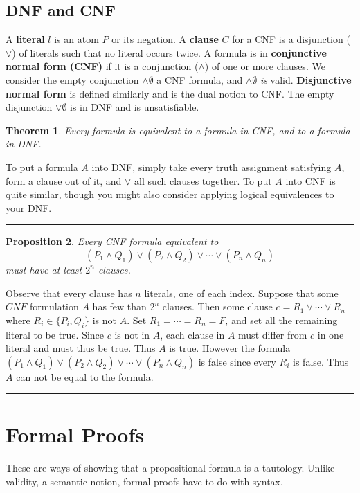 \documentclass[twoside]{article}
\newcounter{lecnum}
\newtheorem{theorem}{Theorem}[lecnum]
\newtheorem{proposition}[theorem]{Proposition}
\newenvironment{proof}{{\bf Proof:}}{\hfill\rule{2mm}{2mm}}
\begin{document}
\subsection{DNF and CNF}
A \textbf{literal} $l$ is an atom $P$ or its negation. A \textbf{clause} $C$ for a CNF is a disjunction ($\lor$) of literals such that no literal occurs twice. A formula is in \textbf{conjunctive normal form (CNF)} if it is a conjunction ($\land$) of one or more clauses. We consider the empty conjunction $\land \emptyset$ a CNF formula, and $\land \emptyset$ \emph{is} valid. \textbf{Disjunctive normal form} is defined similarly and is the dual notion to CNF. The empty disjunction $\lor \emptyset$ is in DNF and is unsatisfiable. 

\begin{theorem}
Every formula is equivalent to a formula in CNF, and to a formula in DNF. 
\end{theorem} 
\begin{proof}
To put a formula $A$ into DNF, simply take every truth assignment satisfying $A$, form a clause out of it, and $\lor$ all such clauses together. To put $A$ into CNF is quite similar, though you might also consider applying logical equivalences to your DNF.    
\end{proof}

\begin{proposition}
Every CNF formula equivalent to 
\[(P_1 \land Q_1) \lor (P_2 \land Q_2) \lor \cdots \lor (P_n \land Q_n)\]
must have at least $2^n$ clauses. 
\end{proposition}
\begin{proof}
Observe that every clause has $n$ literals, one of each index. Suppose that some $CNF$ formulation $A$ has few than $2^n$ clauses. Then some clause $c = R_1 \lor \cdots \lor R_n$ where $R_i \in \{P_i, Q_i \}$ is not $A$. Set $R_1 = \cdots = R_n = F$, and set all the remaining literal to be true. Since $c$ is not in $A$, each clause in $A$ must differ from $c$ in one literal and must thus be true. Thus $A$ is true. However the formula $(P_1 \land Q_1) \lor (P_2 \land Q_2) \lor \cdots \lor (P_n \land Q_n)$ is false since every $R_i$ is false. Thus $A$ can not be equal to the formula.    
\end{proof}


\section{Formal Proofs}
These are ways of showing that a propositional formula is a tautology. Unlike validity, a semantic notion, formal proofs have to do with syntax.
\end{document}
